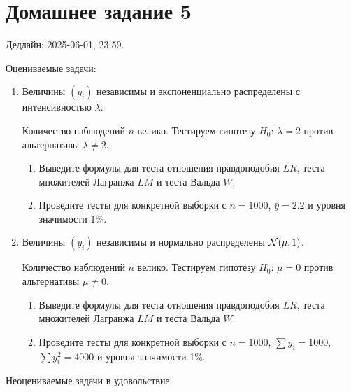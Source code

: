

\section*{Домашнее задание 5}

Дедлайн: 2025-06-01, 23:59.

Оцениваемые задачи:

\begin{enumerate}
\item Величины $(y_i)$ независимы и экспоненциально распределены с интенсивностью $\lambda$.

Количество наблюдений $n$ велико. 
Тестируем гипотезу $H_0$: $\lambda = 2$ против альтернативы $\lambda \neq 2$.
\begin{enumerate}
    \item Выведите формулы для теста отношения правдоподобия $LR$, теста множителей Лагранжа $LM$ и теста Вальда $W$.
    \item Проведите тесты для конкретной выборки с $n = 1000$, $\bar y = 2.2$ и уровня значимости 1\%.
\end{enumerate}
     
\item Величины $(y_i)$ независимы и нормально распределены $\mathcal{N}(\mu, 1)$.

Количество наблюдений $n$ велико. 
Тестируем гипотезу $H_0$: $\mu = 0$ против альтернативы $\mu \neq 0$.
\begin{enumerate}
    \item Выведите формулы для теста отношения правдоподобия $LR$, теста множителей Лагранжа $LM$ и теста Вальда $W$.
    \item Проведите тесты для конкретной выборки с $n = 1000$, $\sum y_i = 1000$, $\sum y_i^2 = 4000$ и уровня значимости 1\%.
\end{enumerate}

\end{enumerate}

Неоцениваемые задачи в удовольствие:

